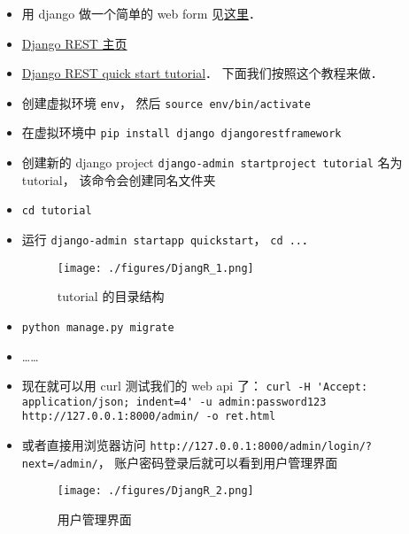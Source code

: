 
\begin{issues}
\issueDraft
\end{issues}

\begin{itemize}
\item 用 django 做一个简单的 web form 见\href{https://www.geeksforgeeks.org/how-to-create-a-form-using-django-forms/}{这里}．
\item \href{https://www.django-rest-framework.org/}{Django REST 主页}
\item \href{https://www.django-rest-framework.org/tutorial/quickstart/}{Django REST quick start tutorial}． 下面我们按照这个教程来做．
\item 创建虚拟环境 \verb|env|， 然后 \verb|source env/bin/activate|
\item 在虚拟环境中 \verb|pip install django djangorestframework|
\item 创建新的 django project \verb|django-admin startproject tutorial| 名为 tutorial， 该命令会创建同名文件夹
\item \verb|cd tutorial|
\item 运行 \verb|django-admin startapp quickstart|， \verb|cd ..|．
\begin{figure}[ht]
\centering
\texttt{[image: ./figures/DjangR\_1.png]}
\caption{tutorial 的目录结构} \label{DjangR_fig1}
\end{figure}
\item \verb|python manage.py migrate|
\item ……
\item 现在就可以用 curl 测试我们的 web api 了： \verb|curl -H 'Accept: application/json; indent=4' -u admin:password123 http://127.0.0.1:8000/admin/ -o ret.html|
\item 或者直接用浏览器访问 \verb|http://127.0.0.1:8000/admin/login/?next=/admin/|， 账户密码登录后就可以看到用户管理界面
\begin{figure}[ht]
\centering
\texttt{[image: ./figures/DjangR\_2.png]}
\caption{用户管理界面} \label{DjangR_fig2}
\end{figure}
\end{itemize}
